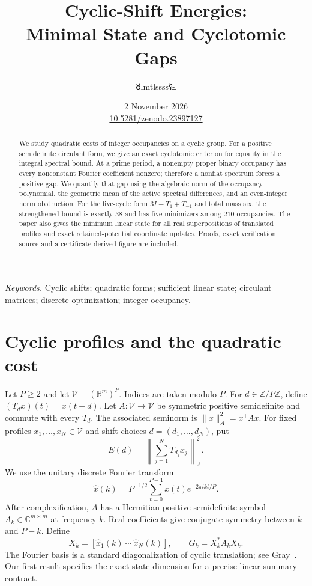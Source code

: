 \documentclass[11pt,a4paper]{article}
\title{\LARGE Cyclic-Shift Energies:\\Minimal State and Cyclotomic Gaps}
\author{{\authorsymbol 🜘}lmtlssss{\authorsymbol 🜐}}
\date{2 November 2026\\[3pt]\small\href{https://doi.org/10.5281/zenodo.23897127}{10.5281/zenodo.23897127}}
\newcommand{\R}{\mathbb R}\newcommand{\C}{\mathbb C}\newcommand{\Z}{\mathbb Z}\newcommand{\N}{\mathbb N}\newcommand{\ip}[2]{\langle #1,#2\rangle}\newcommand{\norm}[1]{\lVert #1\rVert}\newcommand{\one}{\mathbf 1}
\begin{document}
\maketitle\thispagestyle{plain}

\begin{abstract}
We study quadratic costs of integer occupancies on a cyclic group. For a
positive semidefinite circulant form, we give an exact cyclotomic criterion
for equality in the integral spectral bound. At a prime period, a nonempty
proper binary occupancy has every nonconstant Fourier coefficient nonzero;
therefore a nonflat spectrum forces a positive gap. We quantify that gap
using the algebraic norm of the occupancy polynomial, the geometric mean
of the active spectral differences, and an even-integer norm obstruction.
For the five-cycle form $3I+T_1+T_{-1}$ and total mass six, the strengthened
bound is exactly $38$ and has five minimizers among $210$ occupancies.
The paper also gives the minimum linear state for all real superpositions
of translated profiles and exact retained-potential coordinate updates.
Proofs, exact verification source and a certificate-derived figure are included.
\end{abstract}
\noindent\textit{Keywords.} Cyclic shifts; quadratic forms; sufficient linear
state; circulant matrices; discrete optimization; integer occupancy.

\section{Cyclic profiles and the quadratic cost}
Let $P\ge2$ and let $\mathcal V=(\R^m)^P$. Indices are taken modulo $P$.
For $d\in\Z/P\Z$, define $(T_dx)(t)=x(t-d)$.
Let $A:\mathcal V\to\mathcal V$ be symmetric positive semidefinite and commute
with every $T_d$. The associated seminorm is
$\norm{x}_A^2=x^\mathsf T A x$.
For fixed profiles $x_1,\ldots,x_N\in\mathcal V$ and shift choices
$d=(d_1,\ldots,d_N)$, put
\begin{equation}\label{eq:cost}
 E(d)=\left\|\sum_{j=1}^N T_{d_j}x_j\right\|_A^2.
\end{equation}
We use the unitary discrete Fourier transform
\[
 \widehat x(k)=P^{-1/2}\sum_{t=0}^{P-1}x(t)e^{-2\pi i kt/P}.
\]
After complexification, $A$ has a Hermitian positive semidefinite symbol
$A_k\in\C^{m\times m}$ at frequency $k$. Real coefficients give conjugate
symmetry between $k$ and $P-k$. Define
\begin{equation}\label{eq:gram}
 X_k=[\widehat x_1(k)\ \cdots\ \widehat x_N(k)],\qquad
 G_k=X_k^*A_kX_k.
\end{equation}
The Fourier basis is a standard diagonalization of cyclic translation;
see Gray~\cite{gray}. Our first result specifies the exact state dimension
for a precise linear-summary contract.
\end{document}
